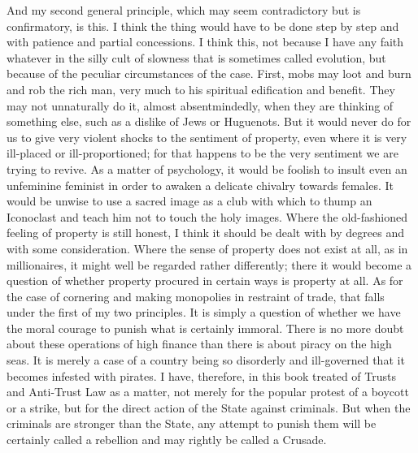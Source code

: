 \documentclass{book}
\begin{document}
And my second general principle, which may seem contradictory but is confirmatory, is this. I think the thing would have to be done step by step and with patience and partial concessions. I think this, not because I have any faith whatever in the silly cult of slowness that is sometimes called evolution, but because of the peculiar circumstances of the case. First, mobs may loot and burn and rob the rich man, very much to his spiritual edification and benefit. They may not unnaturally do it, almost absentmindedly, when they are thinking of something else, such as a dislike of Jews or Huguenots. But it would never do for us to give very violent shocks to the sentiment of property, even where it is very ill-placed or ill-proportioned; for that happens to be the very sentiment we are trying to revive. As a matter of psychology, it would be foolish to insult even an unfeminine feminist in order to awaken a delicate chivalry towards females. It would be unwise to use a sacred image as a club with which to thump an Iconoclast and teach him not to touch the holy images. Where the old-fashioned feeling of property is still honest, I think it should be dealt with by degrees and with some consideration. Where the sense of property does not exist at all, as in millionaires, it might well be regarded rather differently; there it would become a question of whether property procured in certain ways is property at all. As for the case of cornering and making monopolies in restraint of trade, that falls under the first of my two principles. It is simply a question of whether we have the moral courage to punish what is certainly immoral. There is no more doubt about these operations of high finance than there is about piracy on the high seas. It is merely a case of a country being so disorderly and ill-governed that it becomes infested with pirates. I have, therefore, in this book treated of Trusts and Anti-Trust Law as a matter, not merely for the popular protest of a boycott or a strike, but for the direct action of the State against criminals. But when the criminals are stronger than the State, any attempt to punish them will be certainly called a rebellion and may rightly be called a Crusade.
\end{document}
